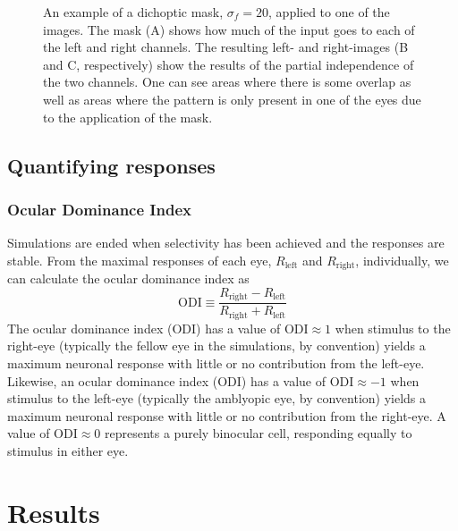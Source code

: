 \documentclass[
  sn-apa,
  pdflatex]{sn-jnl}
\theoremstyle{thmstyleone}%
\theoremstyle{thmstyletwo}%
\theoremstyle{thmstylethree}%
\begin{document}
\begin{figure}
\hypertarget{fig:dichopic_filter_image}{%
\centering

\caption{An example of a dichoptic mask, \(\sigma_f = 20\), applied to
one of the images. The mask (A) shows how much of the input goes to each
of the left and right channels. The resulting left- and right-images (B
and C, respectively) show the results of the partial independence of the
two channels. One can see areas where there is some overlap as well as
areas where the pattern is only present in one of the eyes due to the
application of the mask.}\label{fig:dichopic_filter_image}
}
\end{figure}

\hypertarget{quantifying-responses}{%
\subsection{Quantifying responses}\label{quantifying-responses}}

\hypertarget{ocular-dominance-index}{%
\subsubsection{Ocular Dominance Index}\label{ocular-dominance-index}}

Simulations are ended when selectivity has been achieved and the
responses are stable. From the maximal responses of each eye,
\(R_{\text{left}}\) and \(R_{\text{right}}\), individually, we can
calculate the ocular dominance index as \[
\text{ODI} \equiv \frac{R_{\text{right}}-R_{\text{left}}}{R_{\text{right}}+R_{\text{left}}}
\] The ocular dominance index (ODI) has a value of
\(\text{ODI} \approx 1\) when stimulus to the right-eye (typically the
fellow eye in the simulations, by convention) yields a maximum neuronal
response with little or no contribution from the left-eye. Likewise, an
ocular dominance index (ODI) has a value of \(\text{ODI} \approx -1\)
when stimulus to the left-eye (typically the amblyopic eye, by
convention) yields a maximum neuronal response with little or no
contribution from the right-eye. A value of \(\text{ODI} \approx 0\)
represents a purely binocular cell, responding equally to stimulus in
either eye.

\hypertarget{results}{%
\section{Results}\label{results}}
\end{document}
